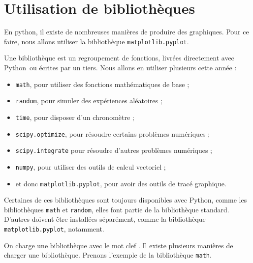 \section{Utilisation de bibliothèques}

En python, il existe de nombreuses manières de produire des graphiques. 
Pour ce faire, nous allons utiliser la bibliothèque \texttt{matplotlib.pyplot}. 

Une bibliothèque est un regroupement de fonctions, livrées directement avec Python\ ou écrites par un tiers.
Nous allons en utiliser plusieurs cette année : 
\begin{itemize}
  \item \texttt{math}, pour utiliser des fonctions mathématiques de base ; 
  \item \texttt{random}, pour simuler des expériences aléatoires ; 
  \item \texttt{time}, pour disposer d'un chronomètre ;
  \item \texttt{scipy.optimize}, pour résoudre certains problèmes numériques ; 
  \item \texttt{scipy.integrate} pour résoudre d'autres problèmes numériques ;
  \item \texttt{numpy}, pour utiliser des outils de calcul vectoriel ; 
  \item et donc \texttt{matplotlib.pyplot}, pour avoir des outils de tracé graphique. 
\end{itemize}
Certaines de ces bibliothèques sont toujours disponibles avec Python, comme les bibliothèques \texttt{math} et \texttt{random}, elles font partie de la bibliothèque standard. 
D'autres doivent être installées séparément, comme la bibliothèque \texttt{matplotlib.pyplot}, notamment. 

On charge une bibliothèque avec le mot clef . Il existe plusieurs manières de charger une bibliothèque. Prenons l'exemple de la bibliothèque \texttt{math}.

